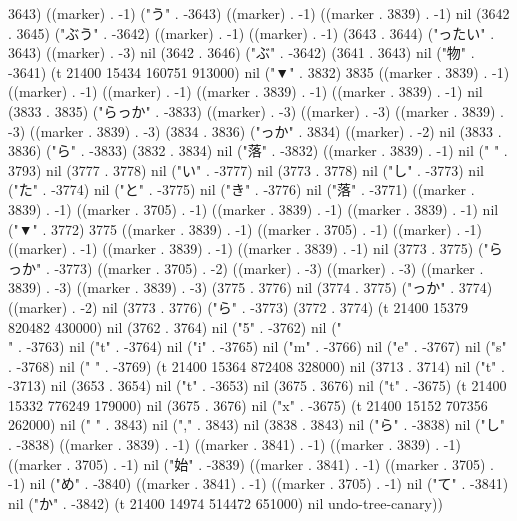 3643) ((marker) . -1) ("う" . -3643) ((marker) . -1) ((marker . 3839) . -1) nil (3642 . 3645) ("ぶう" . -3642) ((marker) . -1) ((marker) . -1) (3643 . 3644) ("ったい" . 3643) ((marker) . -3) nil (3642 . 3646) ("ぶ" . -3642) (3641 . 3643) nil ("物" . -3641) (t 21400 15434 160751 913000) nil ("▼" . 3832) 3835 ((marker . 3839) . -1) ((marker) . -1) ((marker) . -1) ((marker . 3839) . -1) ((marker . 3839) . -1) nil (3833 . 3835) ("らっか" . -3833) ((marker) . -3) ((marker) . -3) ((marker . 3839) . -3) ((marker . 3839) . -3) (3834 . 3836) ("っか" . 3834) ((marker) . -2) nil (3833 . 3836) ("ら" . -3833) (3832 . 3834) nil ("落" . -3832) ((marker . 3839) . -1) nil ("
" . 3793) nil (3777 . 3778) nil ("い" . -3777) nil (3773 . 3778) nil ("し" . -3773) nil ("た" . -3774) nil ("と" . -3775) nil ("き" . -3776) nil ("落" . -3771) ((marker . 3839) . -1) ((marker . 3705) . -1) ((marker . 3839) . -1) ((marker . 3839) . -1) nil ("▼" . 3772) 3775 ((marker . 3839) . -1) ((marker . 3705) . -1) ((marker) . -1) ((marker) . -1) ((marker . 3839) . -1) ((marker . 3839) . -1) nil (3773 . 3775) ("らっか" . -3773) ((marker . 3705) . -2) ((marker) . -3) ((marker) . -3) ((marker . 3839) . -3) ((marker . 3839) . -3) (3775 . 3776) nil (3774 . 3775) ("っか" . 3774) ((marker) . -2) nil (3773 . 3776) ("ら" . -3773) (3772 . 3774) (t 21400 15379 820482 430000) nil (3762 . 3764) nil ("5" . -3762) nil ("\\" . -3763) nil ("t" . -3764) nil ("i" . -3765) nil ("m" . -3766) nil ("e" . -3767) nil ("s" . -3768) nil (" " . -3769) (t 21400 15364 872408 328000) nil (3713 . 3714) nil ("t" . -3713) nil (3653 . 3654) nil ("t" . -3653) nil (3675 . 3676) nil ("t" . -3675) (t 21400 15332 776249 179000) nil (3675 . 3676) nil ("x" . -3675) (t 21400 15152 707356 262000) nil (" " . 3843) nil ("," . 3843) nil (3838 . 3843) nil ("ら" . -3838) nil ("し" . -3838) ((marker . 3839) . -1) ((marker . 3841) . -1) ((marker . 3839) . -1) ((marker . 3705) . -1) nil ("始" . -3839) ((marker . 3841) . -1) ((marker . 3705) . -1) nil ("め" . -3840) ((marker . 3841) . -1) ((marker . 3705) . -1) nil ("て" . -3841) nil ("か" . -3842) (t 21400 14974 514472 651000) nil undo-tree-canary))
